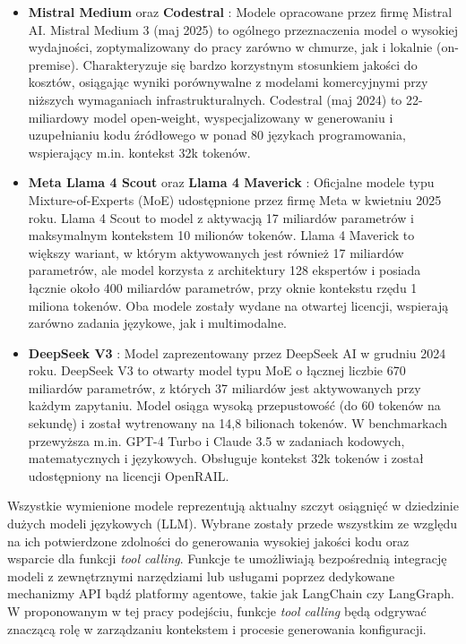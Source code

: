 \begin{itemize}
    \item \textbf{Mistral Medium} \cite{mistral_medium_3} oraz \textbf{Codestral} \cite{codestral}: Modele opracowane przez firmę Mistral AI. Mistral Medium 3 (maj 2025) to ogólnego przeznaczenia model o wysokiej wydajności, zoptymalizowany do pracy zarówno w chmurze, jak i lokalnie (on-premise). Charakteryzuje się bardzo korzystnym stosunkiem jakości do kosztów, osiągając wyniki porównywalne z modelami komercyjnymi przy niższych wymaganiach infrastrukturalnych. Codestral (maj 2024) to 22-miliardowy model open-weight, wyspecjalizowany w generowaniu i uzupełnianiu kodu źródłowego w ponad 80 językach programowania, wspierający m.in. kontekst 32k tokenów.

    \item \textbf{Meta Llama 4 Scout} oraz \textbf{Llama 4 Maverick} \cite{llama4}: Oficjalne modele typu Mixture-of-Experts (MoE) \cite{masoudnia_mixture_2014} udostępnione przez firmę Meta w kwietniu 2025 roku. Llama 4 Scout to model z aktywacją 17 miliardów parametrów i maksymalnym kontekstem 10 milionów tokenów. Llama 4 Maverick to większy wariant, w którym aktywowanych jest również 17 miliardów parametrów, ale model korzysta z architektury 128 ekspertów i posiada łącznie około 400 miliardów parametrów, przy oknie kontekstu rzędu 1 miliona tokenów. Oba modele zostały wydane na otwartej licencji, wspierają zarówno zadania językowe, jak i multimodalne.

    \item \textbf{DeepSeek V3} \cite{deepseek_v3}: Model zaprezentowany przez DeepSeek AI w grudniu 2024 roku. DeepSeek V3 to otwarty model typu MoE o łącznej liczbie 670 miliardów parametrów, z których 37 miliardów jest aktywowanych przy każdym zapytaniu. Model osiąga wysoką przepustowość (do 60 tokenów na sekundę) i został wytrenowany na 14,8 bilionach tokenów. W benchmarkach przewyższa m.in. GPT-4 Turbo i Claude 3.5 w zadaniach kodowych, matematycznych i językowych. Obsługuje kontekst 32k tokenów i został udostępniony na licencji OpenRAIL.
\end{itemize}

Wszystkie wymienione modele reprezentują aktualny szczyt osiągnięć w dziedzinie dużych modeli językowych (LLM). Wybrane zostały przede wszystkim ze względu na ich potwierdzone zdolności do generowania wysokiej jakości kodu oraz wsparcie dla funkcji \textit{tool calling}. Funkcje te umożliwiają bezpośrednią integrację modeli z zewnętrznymi narzędziami lub usługami poprzez dedykowane mechanizmy API bądź platformy agentowe, takie jak LangChain czy LangGraph. W proponowanym w tej pracy podejściu, funkcje \textit{tool calling} będą odgrywać znaczącą rolę w zarządzaniu kontekstem i procesie generowania konfiguracji.

